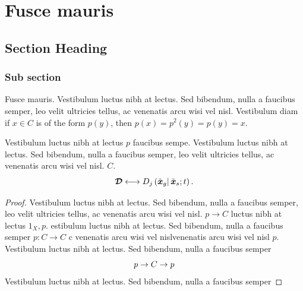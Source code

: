 \chapter{Fusce mauris}
\label{appa}


\lipsum[5]



\vspace*{13pt}

\section{Section Heading}
\label{appa:secA.1}

\subsection{Sub section}
\label{appa:secA.1.1}


Fusce mauris. Vestibulum luctus nibh at lectus. Sed bibendum, nulla a faucibus semper, leo velit
ultricies tellus, ac venenatis arcu wisi vel nisl. Vestibulum diam if $x\in C$ is of the form $p(y)$, then $p(x)=p^2(y)=p(y)=x$.

\begin{lemma}\label{l:retr} Vestibulum luctus nibh at lectus $p$ faucibus sempe. Vestibulum luctus nibh at lectus. Sed bibendum, nulla a faucibus semper, leo velit ultricies tellus, ac venenatis arcu wisi vel nisl. $C$.
\begin{equation}{\boldsymbol{\mathcal{D}}}\longleftrightarrow \text{\textit{$D_j$}}\left(\tilde{\boldsymbol x}_{\text{\textit{$g$}}}|\,\tilde{\boldsymbol x}_s;\text{\textit{$t$}}\right).\end{equation}
\end{lemma}

\begin{proof} Vestibulum luctus nibh at lectus. Sed bibendum, nulla a faucibus semper, leo velit
ultricies tellus, ac venenatis arcu wisi vel nisl. $p\to C$ luctus nibh at lectus $1_X,p$. estibulum luctus nibh at lectus. Sed bibendum, nulla a faucibus semper $p:C\to C$ c venenatis arcu wisi vel nislvenenatis arcu wisi vel nisl $p$. Vestibulum luctus nibh at lectus. Sed bibendum, nulla a faucibus semper
\begin{equation*}\vspace*{-3pt}
p\to C\to p\vspace*{-3pt}
\end{equation*}
Vestibulum luctus nibh at lectus. Sed bibendum, nulla a faucibus semper
\end{proof}


